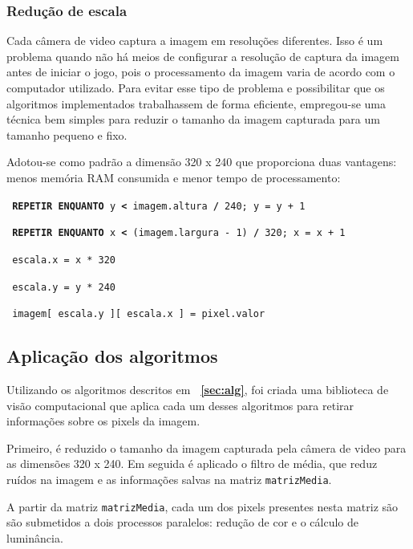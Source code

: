 \documentclass[12pt]{article}
\begin{document}
\subsubsection{Redu\c c\~ao de escala}
Cada c\^amera de video captura a imagem em resolu\c c\~oes diferentes. Isso \'e um problema quando n\~ao h\'a
meios de configurar a resolu\c c\~ao de captura da imagem antes de iniciar o jogo, pois o processamento da imagem
varia de acordo com o computador utilizado. Para evitar esse tipo de problema e possibilitar que os algoritmos implementados
trabalhassem de forma eficiente, empregou-se uma t\'ecnica bem simples para reduzir
o tamanho da imagem capturada para um tamanho pequeno e fixo.
 
Adotou-se como padr\~ao a dimens\~ao 320 x 240 que proporciona duas vantagens: menos mem\'oria RAM consumida
 e menor tempo de processamento:

\noindent \texttt{\footnotesize{ \textbf{REPETIR ENQUANTO} y \textbf{<} imagem.altura \textbf{/} 240; y = y + 1} }

\hspace{0.2cm} \texttt{\footnotesize{ \textbf{REPETIR ENQUANTO} x \textbf{<} (imagem.largura - 1) \textbf{/} 320; x = x + 1}}

\hspace{0.4cm} \texttt{\footnotesize{ escala.x = x * 320}}

\hspace{0.4cm} \texttt{\footnotesize{ escala.y = y * 240}}

\hspace{0.4cm} \texttt{\footnotesize{ imagem[ escala.y ][ escala.x ] = pixel.valor}}
\vspace{0.5cm}

\subsection{Aplica\c c\~ao dos algoritmos}
Utilizando os algoritmos descritos em \textbf{~\ref{sec:alg}}, foi criada uma biblioteca de vis\~ao computacional que aplica cada um desses
algoritmos para retirar informa\c c\~oes sobre os pixels da imagem.

Primeiro, \'e reduzido o tamanho da imagem capturada pela c\^amera de video para as dimens\~oes 320 x 240.
Em seguida \'e aplicado o filtro de m\'edia, que reduz ru\'idos na imagem e as informa\c c\~oes salvas na matriz \texttt{matrizMedia}.

A partir da matriz \texttt{matrizMedia}, cada um dos pixels presentes nesta matriz s\~ao são submetidos a dois processos paralelos: 
redu\c c\~ao de cor e o c\'alculo de lumin\^ancia.
\end{document}
